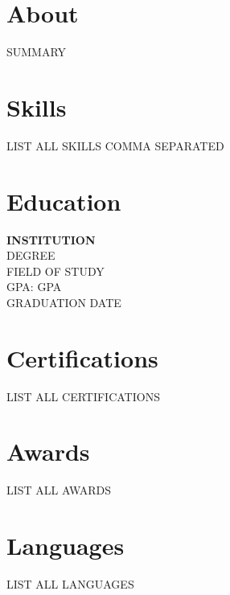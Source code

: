 \documentclass[letterpaper,10pt]{article}
\begin{document}
\begin{minipage}[t]{0.33\textwidth}

\section{About}
\small SUMMARY

\section{Skills}
\small LIST ALL SKILLS COMMA SEPARATED

\section{Education}
\textbf{INSTITUTION} \\
\small DEGREE \\
\small FIELD OF STUDY \\
\small GPA: GPA \\
\small GRADUATION DATE

\section{Certifications}
\small LIST ALL CERTIFICATIONS

\section{Awards}
\small LIST ALL AWARDS

\section{Languages}
\small LIST ALL LANGUAGES

\end{minipage}
\end{document}
